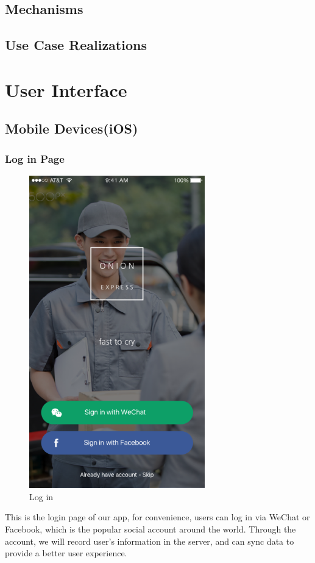 \documentclass[12pt]{scrreprt}
\begin{document}
\section{Mechanisms}

\section{Use Case Realizations}

\chapter{User Interface}
\section{Mobile Devices(iOS)}
\subsection{Log in Page}
\begin{figure}[htbp]
  \centering\includegraphics[width=3in]{DocumentRes/Login.png}
  \caption{Log in}
\end{figure}
This is the login page of our app, for convenience, users can log in via WeChat or
Facebook, which is the popular social account around the world. Through the
account, we will record user's information in the server, and can sync data to
provide a better user experience.
\end{document}
